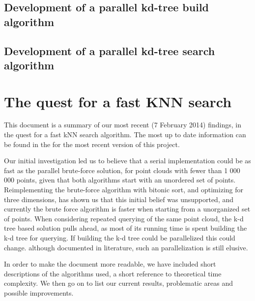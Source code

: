 
\subsection{Development of a parallel kd-tree build algorithm} %
\label{sub:development_of_a_parallel_kd_tree_build_algorithm}




\subsection{Development of a parallel kd-tree search algorithm} %
\label{sub:development_of_a_parallel_kd_tree_search_algorithm}


\section{The quest for a fast KNN search} %
\label{sec:the_quest_for_a_fast_KNN_search}

This document is a summary of our most recent (7 February 2014) findings, in the quest for a fast kNN search algorithm. The most up to date information can be found in the
for the most recent version of this project.

Our initial investigation led us to believe that a serial implementation could be as fast as the parallel brute-force solution, for point clouds with fewer than 1 000 000 points, given that both algorithms start with an unordered set of points. Reimplementing the brute-force algorithm with bitonic sort, and optimizing for three dimensions, has shown us that this initial belief was unsupported, and currently the brute force algorithm is faster when starting from a unorganized set of points. When considering repeated querying of the same point cloud, the k-d tree based solution pulls ahead, as most of its running time is spent building the k-d tree for querying. If building the k-d tree could be parallelized this could change. although documented in literature, such an parallelization is still elusive.

In order to make the document more readable, we have included short descriptions of the algorithms used, a short reference to theoretical time complexity. We then go on to list our current results, problematic areas and possible improvements.

